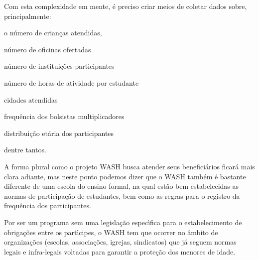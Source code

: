 \documentclass[
12pt,		%
openright,	%
twoside,  %
a4paper,			%
chapter=TITLE,		%
english,			%
french,				%
spanish,			%
brazil				%
]{USPSC-classe/USPSC}
\begin{document}
Com esta complexidade em mente, \'e preciso criar meios de coletar dados sobre, principalmente:















\begin{alineas}
\item o n\'umero de crian\c{c}as atendidas,
\item n\'umero de oficinas ofertadas
\item n\'umero de institui\c{c}\~oes participantes
\item n\'umero de horas de atividade por estudante
\item cidades atendidas
\item frequ\^encia dos bolsistas multiplicadores
\item distribui\c{c}\~ao et\'aria dos participantes
\end{alineas}

dentre tantos.














A forma plural como o projeto WASH busca atender seus benefici\'arios ficar\'a mais clara adiante, mas neste ponto podemos dizer que o WASH tamb\'em \'e bastante diferente de uma escola do ensino formal, na qual est\~ao bem estabelecidas as normas de participa\c{c}\~ao de estudantes, bem como as regras para o registro da frequ\^encia dos participantes.














Por ser um programa sem uma legisla\c{c}\~ao espec\'{\i}fica para o estabelecimento de obriga\c{c}\~oes entre os part\'{\i}cipes, o WASH tem que ocorrer no \^ambito de organiza\c{c}\~oes (escolas, associa\c{c}\~oes, igrejas, sindicatos) que j\'a seguem normas legais e infra-legais voltadas para garantir a prote\c{c}\~ao dos menores de idade.
\end{document}
